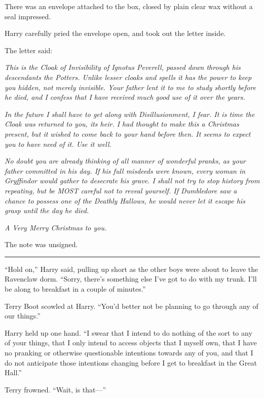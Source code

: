 There was an envelope attached to the box, closed by plain clear wax
without a seal impressed.

Harry carefully pried the envelope open, and took out the letter inside.

The letter said:

\emph{This is the Cloak of Invisibility of Ignotus Peverell, passed down
through his descendants the Potters. Unlike lesser cloaks and spells it
has the power to keep you hidden, not merely invisible. Your father lent
it to me to study shortly before he died, and I confess that I have
received much good use of it over the years.}

\emph{In the future I shall have to get along with Disillusionment, I
fear. It is time the Cloak was returned to you, its heir. I had thought
to make this a Christmas present, but it wished to come back to your
hand before then. It seems to expect you to have need of it. Use it
well.}

\emph{No doubt you are already thinking of all manner of wonderful
pranks, as your father committed in his day. If his full misdeeds were
known, every woman in Gryffindor would gather to desecrate his grave. I
shall not try to stop history from repeating, but be MOST careful not to
reveal yourself. If Dumbledore saw a chance to possess one of the
Deathly Hallows, he would never let it escape his grasp until the day he
died.}

\emph{A Very Merry Christmas to you.}

The note was unsigned.

\begin{center}\rule{3in}{0.4pt}\end{center}

``Hold on,'' Harry said, pulling up short as the other boys were about
to leave the Ravenclaw dorm. ``Sorry, there's something else I've got to
do with my trunk. I'll be along to breakfast in a couple of minutes.''

Terry Boot scowled at Harry. ``You'd better not be planning to go
through any of our things.''

Harry held up one hand. ``I swear that I intend to do nothing of the
sort to any of your things, that I only intend to access objects that I
myself own, that I have no pranking or otherwise questionable intentions
towards any of you, and that I do not anticipate those intentions
changing before I get to breakfast in the Great Hall.''

Terry frowned. ``Wait, is that---''

